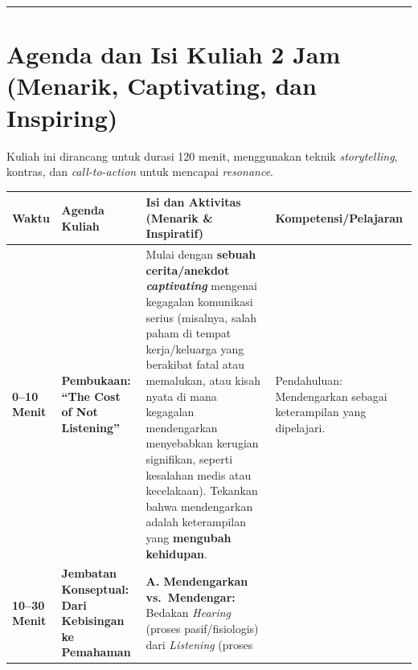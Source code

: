 \documentclass[
  letterpaper,
  DIV=11,
  numbers=noendperiod]{scrreprt}
\begin{document}
\begin{center}\rule{0.5\linewidth}{0.5pt}\end{center}

\section{Agenda dan Isi Kuliah 2 Jam (Menarik, Captivating, dan
Inspiring)}\label{agenda-dan-isi-kuliah-2-jam-menarik-captivating-dan-inspiring}

Kuliah ini dirancang untuk durasi 120 menit, menggunakan teknik
\emph{storytelling}, kontras, dan \emph{call-to-action} untuk mencapai
\emph{resonance}.

\begin{longtable}[]{@{}
  >{\centering\arraybackslash}p{}
  >{\raggedright\arraybackslash}p{}
  >{\raggedright\arraybackslash}p{}
  >{\raggedright\arraybackslash}p{}@{}}
\toprule\noalign{}
\begin{minipage}[b]{\linewidth}\centering
Waktu
\end{minipage} & \begin{minipage}[b]{\linewidth}\raggedright
Agenda Kuliah
\end{minipage} & \begin{minipage}[b]{\linewidth}\raggedright
Isi dan Aktivitas (Menarik \& Inspiratif)
\end{minipage} & \begin{minipage}[b]{\linewidth}\raggedright
Kompetensi/Pelajaran
\end{minipage} \\
\midrule\noalign{}
\endhead
\bottomrule\noalign{}
\endlastfoot
\textbf{0--10 Menit} & \textbf{Pembukaan: ``The Cost of Not Listening''}
& Mulai dengan \textbf{sebuah cerita/anekdot \emph{captivating}}
mengenai kegagalan komunikasi serius (misalnya, salah paham di tempat
kerja/keluarga yang berakibat fatal atau memalukan, atau kisah nyata di
mana kegagalan mendengarkan menyebabkan kerugian signifikan, seperti
kesalahan medis atau kecelakaan). Tekankan bahwa mendengarkan adalah
keterampilan yang \textbf{mengubah kehidupan}. & Pendahuluan:
Mendengarkan sebagai keterampilan yang dipelajari. \\
\textbf{10--30 Menit} & \textbf{Jembatan Konseptual: Dari Kebisingan ke
Pemahaman} & \textbf{A. Mendengarkan vs.~Mendengar:} Bedakan
\emph{Hearing} (proses pasif/fisiologis) dari \emph{Listening} (proses

\end{longtable}
\end{document}

